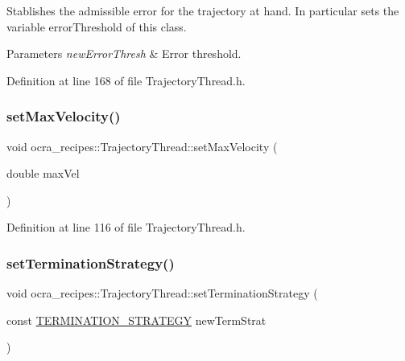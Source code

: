Stablishes the admissible error for the trajectory at hand. In particular sets the variable error\+Threshold of this class.


\begin{DoxyParams}{Parameters}
{\em new\+Error\+Thresh} & Error threshold. \\
\hline
\end{DoxyParams}


Definition at line 168 of file Trajectory\+Thread.\+h.

\hypertarget{classocra__recipes_1_1TrajectoryThread_af09fa5d00ba024d18fd85870f878c1dd}{}\label{classocra__recipes_1_1TrajectoryThread_af09fa5d00ba024d18fd85870f878c1dd} 
\subsubsection{\texorpdfstring{set\+Max\+Velocity()}{setMaxVelocity()}}
{\footnotesize\ttfamily void ocra\+\_\+recipes\+::\+Trajectory\+Thread\+::set\+Max\+Velocity (\begin{DoxyParamCaption}\item[{double}]{max\+Vel }\end{DoxyParamCaption})\hspace{0.3cm}{\ttfamily [inline]}}



Definition at line 116 of file Trajectory\+Thread.\+h.

\hypertarget{classocra__recipes_1_1TrajectoryThread_ab401be5b4261576175d690b6e4a61177}{}\label{classocra__recipes_1_1TrajectoryThread_ab401be5b4261576175d690b6e4a61177} 
\subsubsection{\texorpdfstring{set\+Termination\+Strategy()}{setTerminationStrategy()}}
{\footnotesize\ttfamily void ocra\+\_\+recipes\+::\+Trajectory\+Thread\+::set\+Termination\+Strategy (\begin{DoxyParamCaption}\item[{const \hyperlink{namespaceocra__recipes_afcf7ca623a6c39b246aa4bda629c7309}{T\+E\+R\+M\+I\+N\+A\+T\+I\+O\+N\+\_\+\+S\+T\+R\+A\+T\+E\+GY}}]{new\+Term\+Strat }\end{DoxyParamCaption})\hspace{0.3cm}{\ttfamily [inline]}}

